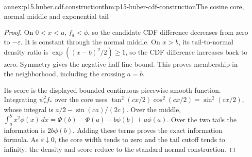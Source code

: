 \begin{annexitem}{annex:p15.huber.cdf.construction}{thm:p15-huber-cdf-construction}{The cosine core, normal middle and exponential tail}
\begin{proof}
On \(0<x<a\), \(f_a<\phi\), so the candidate CDF difference
decreases from zero to \(-\varepsilon\). It is constant through
the normal middle. On \(x>b\), its tail-to-normal density ratio
is \(\exp((x-b)^2/2)\geq1\), so the CDF difference increases back
to zero. Symmetry gives the negative half-line bound. This proves
membership in the neighborhood, including the crossing \(a=b\).

Its score is the displayed bounded continuous piecewise smooth
function. Integrating \(\psi_*^2 f_*\) over the core uses
\(\tan^2(cx/2)\cos^2(cx/2)=\sin^2(cx/2)\), whose integral is
\(a/2-\sin(ca)/(2c)\). Over the middle,
\(\int_a^b x^2\phi(x)\,dx=\Phi(b)-\Phi(a)-b\phi(b)+a\phi(a)\).
Over the two tails the information is \(2b\phi(b)\).
Adding these terms proves the exact information formula.
As \(\varepsilon\downarrow0\), the core width tends to zero
and the tail cutoff tends to infinity; the density and score
reduce to the standard normal construction.
\end{proof}
\end{annexitem}

